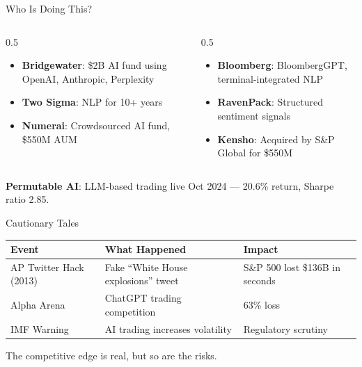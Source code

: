 \documentclass[aspectratio=169]{beamer}
\begin{document}
\begin{frame}{Who Is Doing This?}
\begin{columns}[T]
\begin{column}{0.5\textwidth}
\begin{shadedbox}[title=\textbf{Hedge Funds}]
\begin{itemize}\small
  \item \textbf{Bridgewater}: \$2B AI fund using OpenAI, Anthropic, Perplexity
  \item \textbf{Two Sigma}: NLP for 10+ years
  \item \textbf{Numerai}: Crowdsourced AI fund, \$550M AUM
\end{itemize}
\end{shadedbox}
\end{column}
\begin{column}{0.5\textwidth}
\begin{shadedbox}[title=\textbf{Platforms}]
\begin{itemize}\small
  \item \textbf{Bloomberg}: BloombergGPT, terminal-integrated NLP
  \item \textbf{RavenPack}: Structured sentiment signals
  \item \textbf{Kensho}: Acquired by S\&P Global for \$550M
\end{itemize}
\end{shadedbox}
\end{column}
\end{columns}
\vspace{0.3cm}
\textbf{Permutable AI}: LLM-based trading live Oct 2024 --- \alert{20.6\% return, Sharpe ratio 2.85}.
\end{frame}

\begin{frame}{Cautionary Tales}
\begin{center}\small
\begin{tabular}{@{} l l l @{}}
\toprule
\textbf{Event} & \textbf{What Happened} & \textbf{Impact} \\
\midrule
AP Twitter Hack (2013) & Fake ``White House explosions'' tweet & S\&P 500 lost \$136B in seconds \\
Alpha Arena & ChatGPT trading competition & 63\% loss \\
IMF Warning & AI trading increases volatility & Regulatory scrutiny \\
\bottomrule
\end{tabular}
\end{center}
\vspace{0.3cm}
\begin{center}
\alert{The competitive edge is real, but so are the risks.}
\end{center}
\end{frame}
\end{document}
